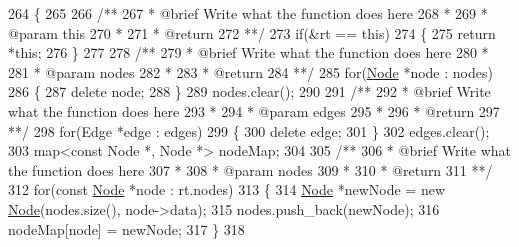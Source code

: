 \begin{DoxyCode}
264         \{
265 \textcolor{comment}{}
266 \textcolor{comment}{            /**}
267 \textcolor{comment}{             * @brief Write what the function does here}
268 \textcolor{comment}{             *}
269 \textcolor{comment}{             * @param this}
270 \textcolor{comment}{             *}
271 \textcolor{comment}{             * @return}
272 \textcolor{comment}{             **/}
273             \textcolor{keywordflow}{if}(&rt == \textcolor{keyword}{this})
274             \{
275                 \textcolor{keywordflow}{return} *\textcolor{keyword}{this};
276             \}
277 \textcolor{comment}{}
278 \textcolor{comment}{            /**}
279 \textcolor{comment}{             * @brief Write what the function does here}
280 \textcolor{comment}{             *}
281 \textcolor{comment}{             * @param nodes}
282 \textcolor{comment}{             *}
283 \textcolor{comment}{             * @return}
284 \textcolor{comment}{             **/}
285             \textcolor{keywordflow}{for}(\hyperlink{structNode}{Node} *node : nodes)
286             \{
287                 \textcolor{keyword}{delete} node;
288             \}
289             nodes.clear();
290 \textcolor{comment}{}
291 \textcolor{comment}{            /**}
292 \textcolor{comment}{             * @brief Write what the function does here}
293 \textcolor{comment}{             *}
294 \textcolor{comment}{             * @param edges}
295 \textcolor{comment}{             *}
296 \textcolor{comment}{             * @return}
297 \textcolor{comment}{             **/}
298             \textcolor{keywordflow}{for}(Edge *edge : edges)
299             \{
300                 \textcolor{keyword}{delete} edge;
301             \}
302             edges.clear();
303             map<const Node *, Node *> nodeMap;
304 \textcolor{comment}{}
305 \textcolor{comment}{            /**}
306 \textcolor{comment}{             * @brief Write what the function does here}
307 \textcolor{comment}{             *}
308 \textcolor{comment}{             * @param nodes}
309 \textcolor{comment}{             *}
310 \textcolor{comment}{             * @return}
311 \textcolor{comment}{             **/}
312             \textcolor{keywordflow}{for}(\textcolor{keyword}{const} \hyperlink{structNode}{Node} *node : rt.nodes)
313             \{
314                 \hyperlink{structNode}{Node} *newNode = \textcolor{keyword}{new} \hyperlink{structNode}{Node}(nodes.size(), node->data);
315                 nodes.push\_back(newNode);
316                 nodeMap[node] = newNode;
317             \}
318 \textcolor{comment}{}

\end{DoxyCode}
